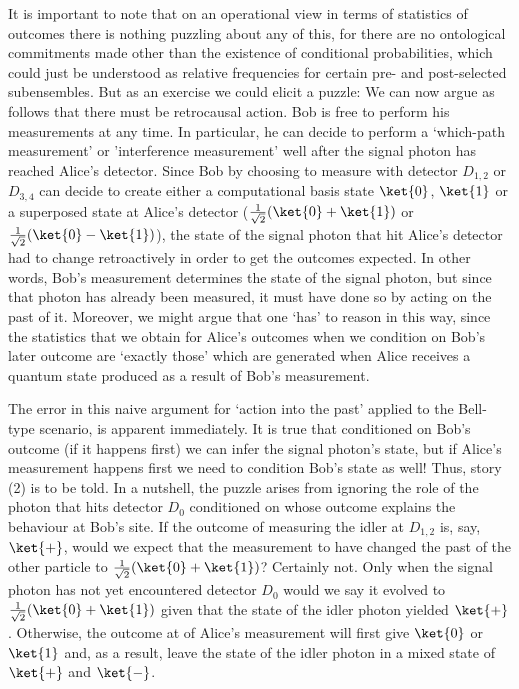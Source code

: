 \documentclass[12pt]{article}
\numberwithin{equation}{section}
\begin{document}
It is important to note that on an operational view in terms of statistics of outcomes there is nothing puzzling about any of this, for there are no ontological commitments made other than the existence of conditional probabilities, which could just be understood as relative frequencies for certain pre- and post-selected subensembles. But as an exercise we could elicit a puzzle: We can now argue as follows that there must be retrocausal action. Bob is free to perform his measurements at any time. In particular, he can decide to perform a `which-path measurement' or 'interference measurement' well after the signal photon has reached Alice's detector. Since Bob by choosing to measure with detector $D_{1,2}$ or $D_{3,4}$ can decide to create either a computational basis state $\ket{0}$, $\ket{1}$ or a superposed state at Alice's detector ($\frac{1}{\sqrt{2}}(\ket{0}+\ket{1})$ or $\frac{1}{\sqrt{2}}(\ket{0}-\ket{1})$), the state of the signal photon that hit Alice's detector had to change retroactively in order to get the outcomes expected. In other words, Bob's measurement determines the state of the signal photon, but since that photon has already been measured, it must have done so by acting on the past of it. Moreover, we might argue that one `has' to reason in this way, since the statistics that we obtain for Alice's outcomes when we condition on Bob's later outcome are `exactly those' which are generated when Alice receives a quantum state produced as a result of Bob's measurement.

The error in this naive argument for `action into the past' applied to the Bell-type scenario, is apparent immediately. It is true that conditioned on Bob's outcome (if it happens first) we can infer the signal photon's state, but if Alice's measurement happens first we need to condition Bob's state as well! Thus, story (2) is to be told. In a nutshell, the puzzle arises from ignoring the role of the photon that hits detector $D_0$ conditioned on whose outcome explains the behaviour at Bob's site. If the outcome of measuring the idler at $D_{1,2}$ is, say, $\ket{+}$, would we expect that the measurement to have changed the past of the other particle to $\frac{1}{\sqrt{2}}(\ket{0}+\ket{1})$? Certainly not. Only when the signal photon has not yet encountered detector $D_0$ would we say it evolved to $\frac{1}{\sqrt{2}}(\ket{0}+\ket{1})$ given that the state of the idler photon yielded $\ket{+}$. Otherwise, the outcome at of Alice's measurement will first give $\ket{0}$ or $\ket{1}$ and, as a result, leave the state of the idler photon in a mixed state of $\ket{+}$ and $\ket{-}$.
\end{document}
